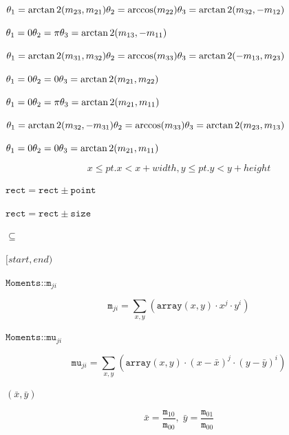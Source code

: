 \documentclass{article}
\begin{document}
$ \theta_1 = \arctan2(m_{23},m_{21}) \\\theta_2 = \arccos(m_{22}) \\\theta_3 = \arctan2(m_{32},-m_{12}) $
\pagebreak

$ \theta_1=0\\ \theta_2=\pi\\ \theta_3=\arctan2(m_{13},-m_{11}) $
\pagebreak

$ \theta_1 = \arctan2(m_{31},m_{32}) \\\theta_2 = \arccos(m_{33}) \\\theta_3 = \arctan2(-m_{13},m_{23})$
\pagebreak

$ \theta_1=0\\ \theta_2=0\\ \theta_3=\arctan2(m_{21},m_{22}) $
\pagebreak

$ \theta_1= 0\\ \theta_2=\pi\\ \theta_3=\arctan2(m_{21},m_{11}) $
\pagebreak

$ \theta_1 = \arctan2(m_{32},-m_{31})\\\theta_2 = \arccos(m_{33}) \\\theta_3 = \arctan2(m_{23},m_{13}) $
\pagebreak

$ \theta_1=0\\ \theta_2=0\\ \theta_3=\arctan2(m_{21},m_{11}) $
\pagebreak

\[x  \leq pt.x < x+width,
      y  \leq pt.y < y+height\]
\pagebreak

$\texttt{rect} = \texttt{rect} \pm \texttt{point}$
\pagebreak

$\texttt{rect} = \texttt{rect} \pm \texttt{size}$
\pagebreak

$\subseteq$
\pagebreak

$[start,end)$
\pagebreak

$\texttt{Moments::m}_{ji}$
\pagebreak

\[\texttt{m} _{ji}= \sum _{x,y}  \left ( \texttt{array} (x,y)  \cdot x^j  \cdot y^i \right )\]
\pagebreak

$\texttt{Moments::mu}_{ji}$
\pagebreak

\[\texttt{mu} _{ji}= \sum _{x,y}  \left ( \texttt{array} (x,y)  \cdot (x -  \bar{x} )^j  \cdot (y -  \bar{y} )^i \right )\]
\pagebreak

$(\bar{x}, \bar{y})$
\pagebreak

\[\bar{x} = \frac{\texttt{m}_{10}}{\texttt{m}_{00}} , \; \bar{y} = \frac{\texttt{m}_{01}}{\texttt{m}_{00}}\]
\pagebreak
\end{document}
